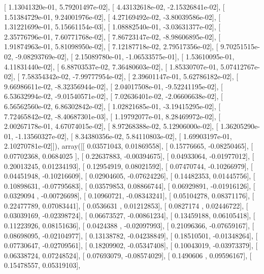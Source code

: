 \documentclass{article}
\begin{document}
       [  1.13041320e-01,   5.79201497e-02],
       [  4.43132618e-02,  -2.15326841e-02],
       [  1.51384729e-01,   9.24001976e-02],
       [  4.27169492e-02,  -3.80039586e-02],
       [  1.31221699e-01,   5.15661154e-03],
       [  1.08882540e-01,  -3.03631377e-02],
       [  2.35776796e-01,   7.60771768e-02],
       [  7.86723147e-02,  -8.98606895e-02],
       [  1.91874963e-01,   5.81098950e-02],
       [  7.12187718e-02,   2.79517356e-02],
       [  9.70251515e-02,  -9.08293769e-02],
       [  2.15089780e-01,  -1.06533575e-01],
       [  1.53610095e-01,   4.11831440e-02],
       [  6.88703537e-02,   7.36480603e-02],
       [  1.85330707e-01,   5.07412767e-02],
       [  7.58354342e-02,  -7.99777954e-02],
       [  2.39601147e-01,   5.62786182e-02],
       [  9.66986611e-02,  -8.32356944e-02],
       [  2.04017508e-01,  -9.52241195e-02],
       [  6.53632994e-02,  -9.01540571e-02],
       [  7.02636401e-02,  -2.06606638e-02],
       [  6.56562560e-02,   6.86302842e-02],
       [  1.02821685e-01,  -3.19415295e-02],
       [  7.72465842e-02,  -8.40687301e-03],
       [  1.19792077e-01,   8.28469972e-02],
       [  2.00267178e-01,   4.67074015e-02],
       [  8.97268388e-02,   5.12906000e-02],
       [  1.36205290e-01,  -1.13560327e-02],
       [  8.34380356e-02,   5.84110803e-02],
       [  1.69903197e-01,   2.10270781e-02]]), array([[ 0.03571043,  0.01869558],
       [ 0.15776665, -0.08250465],
       [ 0.07702368,  0.0684025 ],
       [ 0.22637883, -0.00394675],
       [ 0.04933064, -0.01977012],
       [ 0.20013245,  0.01234193],
       [ 0.12954919,  0.08021592],
       [ 0.07470744, -0.10266979],
       [ 0.04451948, -0.10216609],
       [ 0.02904605, -0.07624226],
       [ 0.14482353,  0.01445756],
       [ 0.10898631, -0.07795683],
       [ 0.03579853,  0.08866744],
       [ 0.06929891, -0.01916126],
       [ 0.0329094 , -0.00726698],
       [ 0.10960721, -0.08343241],
       [ 0.05104278,  0.08371176],
       [ 0.22477789,  0.07083441],
       [ 0.0536631 ,  0.01212853],
       [ 0.0827174 ,  0.02446722],
       [ 0.03039169, -0.02398724],
       [ 0.06673527, -0.00861234],
       [ 0.13459188,  0.06105418],
       [ 0.11223926,  0.08151636],
       [ 0.0424388 , -0.02097993],
       [ 0.21096366, -0.07659167],
       [ 0.08698095, -0.02104977],
       [ 0.13138782, -0.04238849],
       [ 0.18510501, -0.01348264],
       [ 0.07730647, -0.02709561],
       [ 0.18209902, -0.05347408],
       [ 0.10043019, -0.03973379],
       [ 0.06338724,  0.07248524],
       [ 0.07693079, -0.08574029],
       [ 0.1490606 ,  0.09596167],
       [ 0.15478557,  0.05319103],
\end{document}
